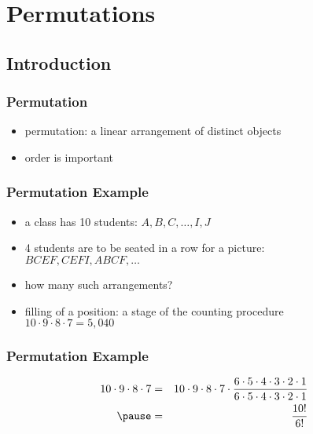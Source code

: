 \documentclass[dvipsnames]{beamer}
\begin{document}
\section{Permutations}

\subsection{Introduction}

\begin{frame}
  \frametitle{Permutation}

  \begin{itemize}
    \item \alert{permutation}: a linear arrangement of distinct objects
    \item order is important
  \end{itemize}
\end{frame}

\begin{frame}
  \frametitle{Permutation Example}

  \begin{itemize}
    \item a class has 10 students: $A, B, C, \ldots, I, J$
    \item 4 students are to be seated in a row for a picture:\\
      \smallskip
      $BCEF, CEFI, ABCF, \ldots$
    \item how many such arrangements?

    \pause
    \medskip
    \item filling of a position: a stage of the counting procedure\\
      $10 \cdot 9 \cdot 8 \cdot 7 = 5,040$
  \end{itemize}
\end{frame}

\begin{frame}
  \frametitle{Permutation Example}

  \begin{eqnarray*}
    10 \cdot 9 \cdot 8 \cdot 7 & = &
      10 \cdot 9 \cdot 8 \cdot 7 \cdot
      \frac{6 \cdot 5 \cdot 4 \cdot 3 \cdot 2 \cdot 1}
      {6 \cdot 5 \cdot 4 \cdot 3 \cdot 2 \cdot 1}\\\pause
    & = & \frac{10!}{6!}
  \end{eqnarray*}
\end{frame}
\end{document}
